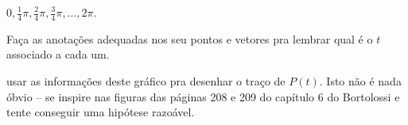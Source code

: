 \documentclass[oneside,12pt]{article}
\begin{document}
$0, \frac14π, \frac24π, \frac34π, \ldots, 2π$.

Faça as anotações adequadas nos seu pontos e vetores pra lembrar qual
é o $t$ associado a cada um.

\msk

 usar as informações deste gráfico pra desenhar o
traço de $P(t)$. Isto não é nada óbvio -- se inspire nas figuras das
páginas 208 e 209 do capítulo 6 do Bortolossi e tente conseguir uma
hipótese razoável.

\msk

\end{document}

